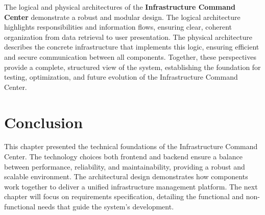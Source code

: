 The logical and physical architectures of the \textbf{Infrastructure Command Center} demonstrate a robust and modular design. The logical architecture highlights responsibilities and information flows, ensuring clear, coherent organization from data retrieval to user presentation. The physical architecture describes the concrete infrastructure that implements this logic, ensuring efficient and secure communication between all components. Together, these perspectives provide a complete, structured view of the system, establishing the foundation for testing, optimization, and future evolution of the Infrastructure Command Center.
\clearpage

\section{Conclusion}
This chapter presented the technical foundations of the Infrastructure Command Center. The technology choices both frontend and backend ensure a balance between performance, reliability, and maintainability, providing a robust and scalable environment. The architectural design demonstrates how components work together to deliver a unified infrastructure management platform. The next chapter will focus on requirements specification, detailing the functional and non-functional needs that guide the system's development.